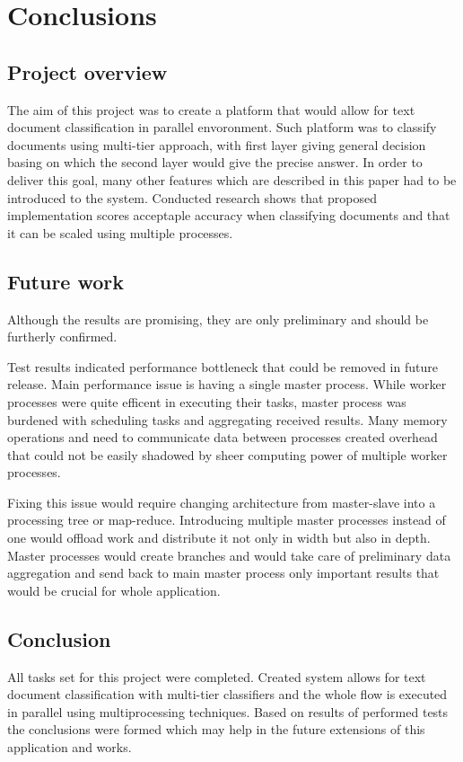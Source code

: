 \chapter{Conclusions} \label{conclusions}

\section{Project overview}
The aim of this project was to create a platform that would allow for text document classification in parallel envoronment. Such platform was to classify documents using multi-tier approach, with first layer giving general decision basing on which the second layer would give the precise answer. In order to deliver this goal, many other features which are described in this paper had to be introduced to the system.
Conducted research shows that proposed implementation scores acceptaple accuracy when classifying documents and that it can be scaled using multiple processes.

\section{Future work}

Although the results are promising, they are only preliminary and should be furtherly confirmed. 

Test results indicated performance bottleneck that could be removed in future release. Main performance issue is having a single master process. While worker processes were quite efficent in executing their tasks, master process was burdened with scheduling tasks and aggregating received results. Many memory operations and need to communicate data between processes created overhead that could not be easily shadowed by sheer computing power of multiple worker processes.

Fixing this issue would require changing architecture from master-slave into a processing tree or map-reduce. Introducing multiple master processes instead of one would offload work and distribute it not only in width but also in depth. Master processes would create branches and would take care of preliminary data aggregation and send back to main master process only important results that would be crucial for whole application.

\section{Conclusion}
All tasks set for this project were completed. Created system allows for text document classification with multi-tier classifiers and the whole flow is executed in parallel using multiprocessing techniques. Based on results of performed tests the conclusions were formed which may help in the future extensions of this application and works.